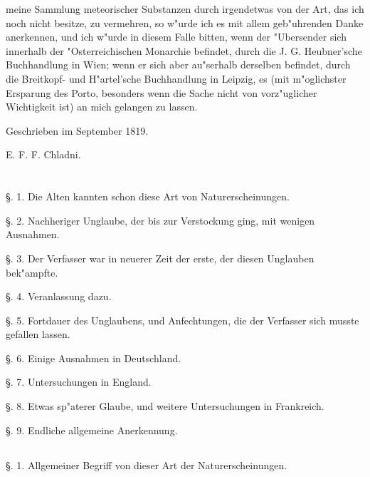 \documentclass[a4paper, 11pt, oneside, polutonikogreek, german]{article}
\begin{document}
meine Sammlung meteorischer Substanzen durch irgendetwas von der Art, das ich noch nicht besitze, zu vermehren, so w"urde ich es mit allem geb"uhrenden Danke anerkennen, und ich w"urde in diesem Falle bitten, wenn der "Ubersender sich innerhalb der "Osterreichischen Monarchie befindet, durch die J. G. Heubner'sche Buchhandlung in Wien; wenn er sich aber au"serhalb derselben befindet, durch die Breitkopf- und H"artel'sche Buchhandlung in Leipzig, es (mit m"oglichster Ersparung des Porto, besonders wenn die Sache nicht von vorz"uglicher Wichtigkeit ist) an mich gelangen zu lassen.

Geschrieben im September 1819.

E. F. F. Chladni.
\clearpage
\section*{}
\subsection*{}
\paragraph{}
§. 1. Die Alten kannten schon diese Art von Naturerscheinungen.

§. 2. Nachheriger Unglaube, der bis zur Verstockung ging, mit wenigen Ausnahmen.

§. 3. Der Verfasser war in neuerer Zeit der erste, der diesen Unglauben bek"ampfte.

§. 4. Veranlassung dazu.

§. 5. Fortdauer des Unglaubens, und Anfechtungen, die der Verfasser sich musste gefallen lassen.

§. 6. Einige Ausnahmen in Deutschland.

§. 7. Untersuchungen in England.

§. 8. Etwas sp"aterer Glaube, und weitere Untersuchungen in Frankreich.

§. 9. Endliche allgemeine Anerkennung.
\subsection*{}
\paragraph{}
§. 1. Allgemeiner Begriff von dieser Art der Naturerscheinungen.
\end{document}
